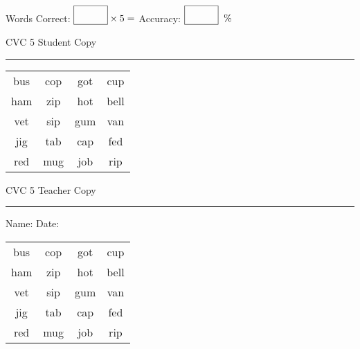 \documentclass{memoir}
\begin{document}
\small

Words Correct: $\fbox{\phantom{\huge 100}} \times 5 = $ Accuracy: $\fbox{\phantom{\huge 100}}\;\; \%$ 

\vfill

\newpage


\footnotesize \noindent
CVC 5 \hfill Student Copy
\smallskip
\hrule

\Large

\setlength{\tabcolsep}{14pt}
\def\arraystretch{2}

{\selectfont


\begin{vplace}[0.5]
\begin{center}
\begin{tabular}{cccc}
bus & cop & got & cup \\
ham & zip & hot & bell \\
vet & sip & gum  & van \\
jig & tab & cap & fed \\
red & mug & job & rip \\
\end{tabular}
\end{center}
\end{vplace}

}

\newpage

\footnotesize \noindent
CVC 5 \hfill Teacher Copy
\smallskip
\hrule

\small

\vfill

\noindent
Name: \underline{\hspace{1.75in}} \hfill Date: \underline{\hspace{1in}}

\Large

{\selectfont


\begin{vplace}[0.5]
\begin{center}
\begin{tabular}{cccc}
bus & cop & got & cup \\
ham & zip & hot & bell \\
vet & sip & gum  & van \\
jig & tab & cap & fed \\
red & mug & job & rip \\
\end{tabular}
\end{center}
\end{vplace}



}
\end{document}
